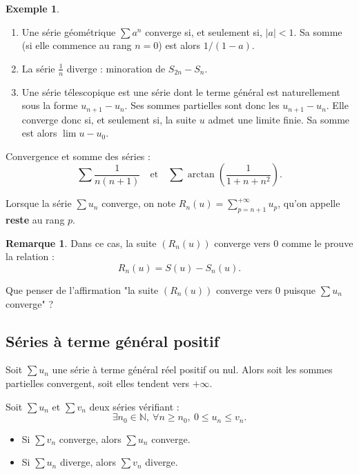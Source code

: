 \documentclass[french]{article}
\newcommand{\N}{\mathbb{N}}
\theoremstyle{plain}
\theoremstyle{definition}
\newtheorem*{ex}{Exemple}
\newtheorem*{rmq}{Remarque}
\theoremstyle{remark}
\begin{document}
\begin{ex}%
	\begin{enumerate}
		\item Une série géométrique $\displaystyle\sum a^n$ converge si, et seulement si, $\lvert a\rvert<1$. Sa somme (si elle commence au rang $n=0$) est alors $1/(1-a)$.
		\item La série $\displaystyle\frac{1}{n}$ diverge : minoration de $S_{2n}-S_n$.
		\item Une série télescopique est une série dont le terme général est naturellement sous la forme $u_{n+1}-u_n$. Ses sommes partielles sont donc les $u_{n+1}-u_n$. Elle converge donc si, et seulement si, la suite $u$ admet une limite finie. Sa somme est alors $\lim u-u_0$.
	\end{enumerate}
\end{ex}

\begin{exo}
	Convergence et somme des séries :
	$$\sum\frac{1}{n(n+1)}\quad \text{et}\quad \sum\arctan\left(\frac{1}{1+n+n^2}\right).$$
\end{exo}

\begin{dfn}
	Lorsque la série $\displaystyle\sum u_n$ converge, on note $\displaystyle R_n(u)=\sum_{p=n+1}^{+\infty}u_p$, qu'on appelle \textbf{reste} au rang $p$.
\end{dfn}

\begin{rmq}
	Dans ce cas, la suite $(R_n(u))$ converge vers $0$ comme le prouve la relation : $$R_n(u)=S(u)-S_n(u).$$
\end{rmq}

\begin{exo}
	Que penser de l'affirmation "la suite $(R_n(u))$ converge vers $0$ puisque $\displaystyle\sum u_n$ converge" ?
\end{exo}

\subsection{Séries à terme général positif}

\begin{prop}%
	Soit $\displaystyle\sum u_n$ une série à terme général réel positif ou nul. Alors soit les sommes partielles convergent, soit elles tendent vers $+\infty$.
\end{prop}

\begin{prop}
	Soit $\displaystyle\sum u_n$ et $\displaystyle\sum v_n$ deux séries vérifiant : $$\exists n_0\in\N,\ \forall n\geqslant n_0,\ 0\leqslant u_n\leqslant v_n.$$
	\begin{itemize}
		\item Si $\displaystyle\sum v_n$ converge, alors $\displaystyle\sum u_n$ converge.
		\item Si $\displaystyle\sum u_n$ diverge, alors $\displaystyle\sum v_n$ diverge.
	\end{itemize}
\end{prop}
\end{document}
